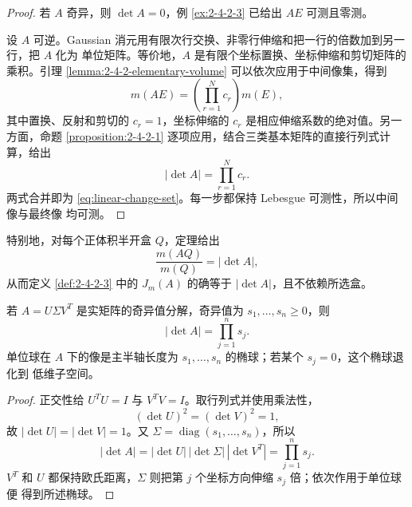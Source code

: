 \begin{proof}
若 $A$ 奇异，则 $\det A=0$，例 \ref{ex:2-4-2-3} 已给出 $AE$ 可测且零测。

设 $A$ 可逆。Gaussian 消元用有限次行交换、非零行伸缩和把一行的倍数加到另一行，把 $A$ 化为
单位矩阵。等价地，$A$ 是有限个坐标置换、坐标伸缩和剪切矩阵的乘积。引理
\ref{lemma:2-4-2-elementary-volume} 可以依次应用于中间像集，得到
\[
 m(AE)=\left(\prod_{r=1}^N c_r\right)m(E),
\]
其中置换、反射和剪切的 $c_r=1$，坐标伸缩的 $c_r$ 是相应伸缩系数的绝对值。另一方面，命题
\ref{proposition:2-4-2-1} 逐项应用，结合三类基本矩阵的直接行列式计算，给出
\[
 |\det A|=\prod_{r=1}^Nc_r.
\]
两式合并即为 \eqref{eq:linear-change-set}。每一步都保持 Lebesgue 可测性，所以中间像与最终像
均可测。
\end{proof}

特别地，对每个正体积半开盒 $Q$，定理给出
\[
 \frac{m(AQ)}{m(Q)}=|\det A|,
\]
从而定义 \ref{def:2-4-2-3} 中的 $J_m(A)$ 的确等于 $|\det A|$，且不依赖所选盒。

\begin{proposition}[奇异值体积公式]\label{proposition:2-4-2-3}
若 $A=U\Sigma V^T$ 是实矩阵的奇异值分解，奇异值为 $s_1,\dots,s_n\ge0$，则
\[
 |\det A|=\prod_{j=1}^ns_j.
\]
单位球在 $A$ 下的像是主半轴长度为 $s_1,\dots,s_n$ 的椭球；若某个 $s_j=0$，这个椭球退化到
低维子空间。
\end{proposition}

\begin{proof}
正交性给 $U^TU=I$ 与 $V^TV=I$。取行列式并使用乘法性，
\[
 (\det U)^2=(\det V)^2=1,
\]
故 $|\det U|=|\det V|=1$。又
$\Sigma=\operatorname{diag}(s_1,\dots,s_n)$，所以
\[
 |\det A|=|\det U|\,|\det\Sigma|\,|\det V^T|
 =\prod_{j=1}^ns_j.
\]
$V^T$ 和 $U$ 都保持欧氏距离，$\Sigma$ 则把第 $j$ 个坐标方向伸缩 $s_j$ 倍；依次作用于单位球便
得到所述椭球。
\end{proof}

